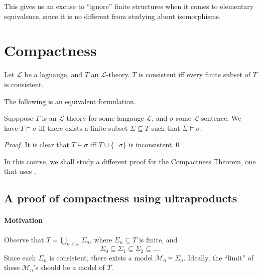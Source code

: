 \documentclass[notoc,notitlepage]{tufte-book}
\begin{document}
\begin{remark}
  This gives us an excuse to ``ignore'' finite structures when it comes to elementary equivalence, since it is no different from studying about isomorphisms.
\end{remark}



\section{Compactness}%
\label{sec:compactness}

\begin{thmnonum}
  Let $\mathcal{L}$ be a lagnauge, and $T$ an $\mathcal{L}$-theory. $T$ is consistent iff every finite subset of $T$ is consistent. 
\end{thmnonum}

The following is an equivalent formulation.

\begin{crly}\label{crly:corollary_of_compactness_theorem}
  Supppose $T$ is an $\mathcal{L}$-theory for some langauge $\mathcal{L}$, and $\sigma$ some $\mathcal{L}$-sentence. We have $T \models \sigma$ iff there exists a finite subset $\Sigma \subseteq T$ such that $\Sigma \models \sigma$.
\end{crly}

\begin{proof}
  It is clear that $T \models \sigma$ iff $T \cup \{ \neg \sigma \}$ is inconsistent.\qed\
\end{proof}

In this course, we shall study a different proof for the Compactness Theorem, one that uses .

\subsection{A proof of compactness using ultraproducts}%
\label{sub:a_proof_of_compactness_using_ultraproducts}

\paragraph{Motivation} Observe that $T = \bigcup_{n < \omega} \Sigma_n$, where $\Sigma_n \subseteq T$ is finite, and
\begin{equation*}
  \Sigma_0 \subseteq \Sigma_1 \subseteq \Sigma_2 \subseteq \hdots.
\end{equation*}
Since each $\Sigma_n$ is consistent, there exists a model $\mathcal{M}_n \models \Sigma_n$. Ideally, the ``limit'' of these $\mathcal{M}_n$'s should be a model of $T$.
\end{document}
